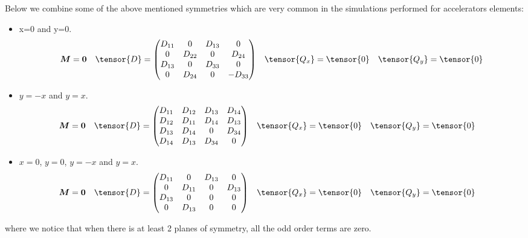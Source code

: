 \begin{apendicesenv}
    Below we combine some of the above mentioned symmetries which are very common in the simulations performed for accelerators elements:

    \begin{itemize}
    \item x=0 and y=0.
    \begin{align}
		\vect{M}= \vect{0} & &
		\tensor{D} = \begin{pmatrix} D_{11} &    0   & D_{13} &    0    \\
                                  0   & D_{22} &    0   &  D_{24} \\
                               D_{13} &    0   & D_{33} &    0    \\
                                  0   & D_{24} &    0   & -D_{33}
               \end{pmatrix} & &
		\tensor{Q_x}=\tensor{0} & &
		\tensor{Q_y}=\tensor{0}
    \end{align}

    \item $y=-x$ and $y=x$.
    \begin{align}
		\vect{M}= \vect{0} & &
		\tensor{D}   &=\begin{pmatrix} D_{11} & D_{12} & D_{13} & D_{14} \\
                               D_{12} & D_{11} & D_{14} & D_{13} \\
                               D_{13} & D_{14} &    0   & D_{34} \\
                               D_{14} & D_{13} & D_{34} &    0
               \end{pmatrix}& &
		\tensor{Q_x}=\tensor{0} & &
		\tensor{Q_y}=\tensor{0}
    \end{align}

    \item $x=0$, $y=0$, $y=-x$ and $y=x$.
    \begin{align}
		\vect{M}= \vect{0} & &
		\tensor{D}   &=\begin{pmatrix} D_{11} &   0    & D_{13} &   0    \\
                                 0    & D_{11} &    0   & D_{13} \\
                               D_{13} &   0    &    0   &   0    \\
                                 0    & D_{13} &    0   &   0
               \end{pmatrix} & &
		\tensor{Q_x}=\tensor{0} & &
		\tensor{Q_y}=\tensor{0}
    \end{align}
    \end{itemize}
    where we notice that when there is at least 2 planes of symmetry, all the odd order terms are zero.



\end{apendicesenv}

